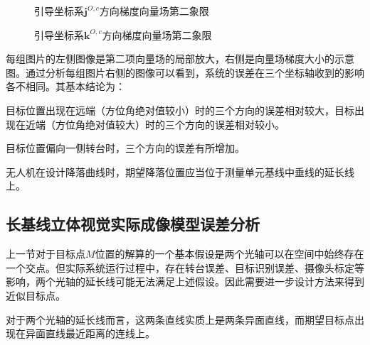 \begin{figure}[htb]
	\centering
	 \qquad
	\caption{引导坐标系$\mathbf{j}^{O,c}$方向梯度向量场第二象限}
	\label{fig:chp03_vision_07_glide_3_y_with_theta_l_r_2_quadrant}
\end{figure}

\begin{figure}[htb]
	\centering
	 \qquad
	\caption{引导坐标系$\mathbf{k}^{O,c}$方向梯度向量场第二象限}
	\label{fig:chp03_vision_08_glide_3_z_with_theta_l_r_2_quadrant}
\end{figure}

每组图片的左侧图像是第二项向量场的局部放大，右侧是向量场梯度大小的示意图。通过分析每组图片右侧的图像可以看到，系统的误差在三个坐标轴收到的影响各不相同。其基本结论为：

\begin{compactenum}
	\item
	目标位置出现在远端（方位角绝对值较小）时的三个方向的误差相对较大，目标出现在近端（方位角绝对值较大）时的三个方向的误差相对较小。
	\item
	目标位置偏向一侧转台时，三个方向的误差有所增加。
	\item
	无人机在设计降落曲线时，期望降落位置应当位于测量单元基线中垂线的延长线上。
\end{compactenum}



\subsection{长基线立体视觉实际成像模型误差分析}
上一节对于目标点$M$位置的解算的一个基本假设是两个光轴可以在空间中始终存在一个交点。但实际系统运行过程中，存在转台误差、目标识别误差、摄像头标定等影响，两个光轴的延长线可能无法满足上述假设。因此需要进一步设计方法来得到近似目标点。

对于两个光轴的延长线而言，这两条直线实质上是两条异面直线，而期望目标点出现在异面直线最近距离的连线上。

